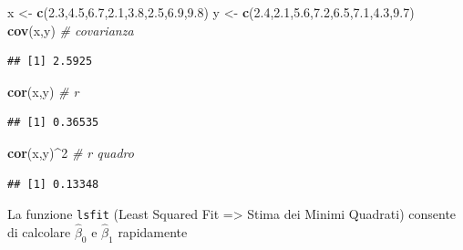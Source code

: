 \documentclass[
  11pt,
]{book}
\newenvironment{Shaded}{\begin{snugshade}}{\end{snugshade}}
\newcommand{\CommentTok}[1]{\textcolor[rgb]{0.56,0.35,0.01}{\textit{#1}}}
\newcommand{\DecValTok}[1]{\textcolor[rgb]{0.00,0.00,0.81}{#1}}
\newcommand{\FloatTok}[1]{\textcolor[rgb]{0.00,0.00,0.81}{#1}}
\newcommand{\FunctionTok}[1]{\textcolor[rgb]{0.13,0.29,0.53}{\textbf{#1}}}
\newcommand{\NormalTok}[1]{#1}
\newcommand{\OtherTok}[1]{\textcolor[rgb]{0.56,0.35,0.01}{#1}}
\newcommand{\SpecialCharTok}[1]{\textcolor[rgb]{0.81,0.36,0.00}{\textbf{#1}}}
\theoremstyle{mytheoremstyle}
\theoremstyle{mydefstyle}
\begin{document}
\begin{Shaded}
\begin{Highlighting}[]
\NormalTok{x }\OtherTok{\textless{}{-}} \FunctionTok{c}\NormalTok{(}\FloatTok{2.3}\NormalTok{,}\FloatTok{4.5}\NormalTok{,}\FloatTok{6.7}\NormalTok{,}\FloatTok{2.1}\NormalTok{,}\FloatTok{3.8}\NormalTok{,}\FloatTok{2.5}\NormalTok{,}\FloatTok{6.9}\NormalTok{,}\FloatTok{9.8}\NormalTok{)}
\NormalTok{y }\OtherTok{\textless{}{-}} \FunctionTok{c}\NormalTok{(}\FloatTok{2.4}\NormalTok{,}\FloatTok{2.1}\NormalTok{,}\FloatTok{5.6}\NormalTok{,}\FloatTok{7.2}\NormalTok{,}\FloatTok{6.5}\NormalTok{,}\FloatTok{7.1}\NormalTok{,}\FloatTok{4.3}\NormalTok{,}\FloatTok{9.7}\NormalTok{)}
\FunctionTok{cov}\NormalTok{(x,y)   }\CommentTok{\# covarianza}
\end{Highlighting}
\end{Shaded}

\begin{verbatim}
## [1] 2.5925
\end{verbatim}

\begin{Shaded}
\begin{Highlighting}[]
\FunctionTok{cor}\NormalTok{(x,y)   }\CommentTok{\# r}
\end{Highlighting}
\end{Shaded}

\begin{verbatim}
## [1] 0.36535
\end{verbatim}

\begin{Shaded}
\begin{Highlighting}[]
\FunctionTok{cor}\NormalTok{(x,y)}\SpecialCharTok{\^{}}\DecValTok{2} \CommentTok{\# r quadro}
\end{Highlighting}
\end{Shaded}

\begin{verbatim}
## [1] 0.13348
\end{verbatim}

La funzione \texttt{lsfit} (Least Squared Fit =\textgreater{} Stima dei Minimi Quadrati) consente
di calcolare \(\hat\beta_0\) e \(\hat\beta_1\) rapidamente

\begin{Shaded}
\end{Shaded}
\end{document}
